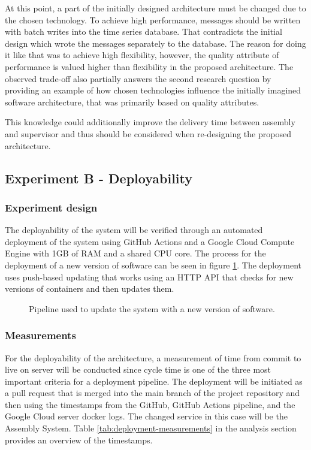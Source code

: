 \documentclass[conference]{IEEEtran}
\begin{document}
At this point, a part of the initially designed architecture must be changed due to the chosen technology. To achieve high performance, messages should be written with batch writes into the time series database. That contradicts the initial design which wrote the messages separately to the database. The reason for doing it like that was to achieve high flexibility, however, the quality attribute of performance is valued higher than flexibility in the proposed architecture. The observed trade-off also partially answers the second research question by providing an example of how chosen technologies influence the initially imagined software architecture, that was primarily based on quality attributes.

This knowledge could additionally improve the delivery time between assembly and supervisor and thus should be considered when re-designing the proposed architecture.

\subsection{Experiment B - Deployability}
\subsubsection{Experiment design}
The deployability of the system will be verified through an automated deployment of the system using GitHub Actions\cite{github_actions} and a Google Cloud Compute Engine\cite{google_cloud} with 1GB of RAM and a shared CPU core. The process for the deployment of a new version of software can be seen in figure \ref{fig:pipeline}. The deployment uses push-based updating that works using an HTTP API that checks for new versions of containers and then updates them.  

\begin{figure}[h]
    \centering
    
    \caption{Pipeline used to update the system with a new version of software.}
    \label{fig:pipeline}
\end{figure}

\subsubsection{Measurements}
For the deployability of the architecture, a measurement of time from commit to live on server will be conducted since cycle time is one of the three most important criteria for a deployment pipeline\cite{bass2012software}. The deployment will be initiated as a pull request that is merged into the main branch of the project repository and then using the timestamps from the GitHub, GitHub Actions pipeline, and the Google Cloud server docker logs. The changed service in this case will be the Assembly System. Table \ref{tab:deployment-measurements} in the analysis section provides an overview of the timestamps.
\end{document}
